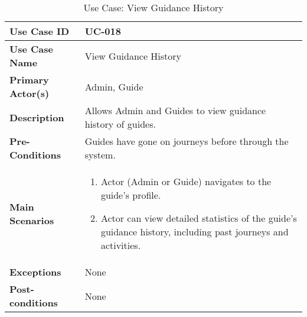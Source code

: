 \begin{table}[ht]
    \centering
    \begin{tabular}{|l|p{}|}
        \hline
        \textbf{Use Case ID} & UC-018\\
        \hline
        \textbf{Use Case Name} & View Guidance History \\
        \hline
        \textbf{Primary Actor(s)} & Admin, Guide \\
        \hline
        \textbf{Description} & Allows Admin and Guides to view guidance history of guides. \\
        \hline
        \textbf{Pre-Conditions} & Guides have gone on journeys before through the system. \\
        \hline
        \textbf{Main Scenarios} & 
        \begin{enumerate}[label=\arabic*.,itemsep=0pt]
            \item Actor (Admin or Guide) navigates to the guide's profile.
            \item Actor can view detailed statistics of the guide's guidance history, including past journeys and activities.
        \end{enumerate} \\
        \hline
        \textbf{Exceptions} & None \\
        \hline
        \textbf{Post-conditions} & None \\
        \hline
    \end{tabular}
    \label{tab:use-case-view-guidance-history}
    \caption{Use Case: View Guidance History}
\end{table}


